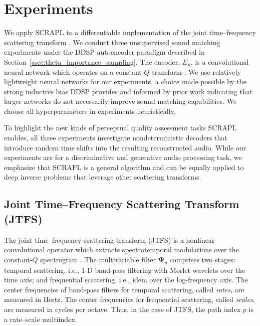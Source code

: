\documentclass{article} %
\theoremstyle{plain}
\theoremstyle{definition}
\theoremstyle{remark}
\begin{document}
\section{Experiments}
\label{sec:experiments}
\vspace{-5pt}

We apply SCRAPL to a differentiable implementation of the joint time--frequency scattering transform \citep{muradeli2022differentiable}.
We conduct three unsupervised sound matching experiments under the DDSP autoencoder paradigm described in Section~\ref{ssec:theta_importance_sampling}.
The encoder, $E_{\boldsymbol{x}}$, is a convolutional neural network which operates on a constant-$Q$ transform \citep{cheuk2020nnaudio}.
We use relatively lightweight neural networks for our experiments, a choice made possible by the strong inductive bias DDSP provides and informed by prior work \citep{han2025gradient} indicating that larger networks do not necessarily improve sound matching capabilities.
We choose all hyperparameters in experiments heuristically.

To highlight the new kinds of perceptual quality assessment tasks SCRAPL enables, all three experiments investigate nondeterministic decoders that introduce random time shifts into the resulting reconstructed audio.
While our experiments are for a discriminative and generative audio processing task, we emphasize that SCRAPL is a general algorithm and can be equally applied to deep inverse problems that leverage other scattering transforms.


\subsection{Joint Time--Frequency Scattering Transform (JTFS)}
\label{ssec:jtfs}
\vspace{-5pt}

The joint time--frequency scattering transform (JTFS) is a nonlinear convolutional operator which extracts spectrotemporal modulations over the constant-$Q$ spectrogram \citep{anden2019joint}.
The multivariable filter $\boldsymbol{\Psi}_p$ comprises two stages: temporal scattering, i.e., 1-D band-pass filtering with Morlet wavelets over the time axis; and frequential scattering, i.e., idem over the log-frequency axis.
The center frequencies of band-pass filters for temporal scattering, called \emph{rates}, are measured in Hertz.
The center frequencies for frequential scattering, called \emph{scales}, are measured in cycles per octave.
Thus, in the case of JTFS, the path index $p$ is a rate--scale multiindex. 
\end{document}
